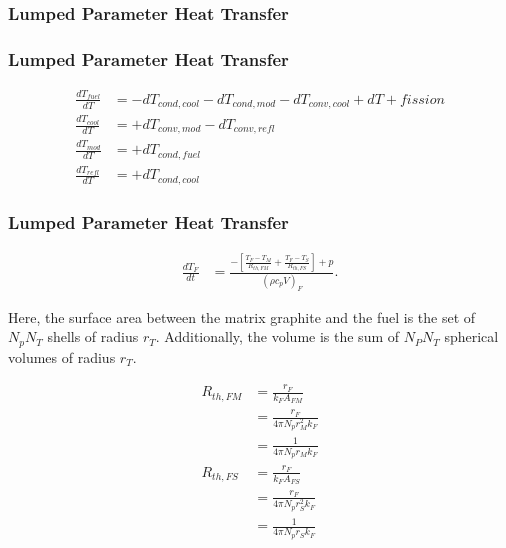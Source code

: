 \begin{frame}[fragile]
  \frametitle{Lumped Parameter Heat Transfer}

\end{frame}

\begin{frame}[fragile]
  \frametitle{Lumped Parameter Heat Transfer}
\footnotesize{
  \begin{align} 
    \frac{dT_{fuel}}{dT} &=  - dT_{cond,cool} - dT_{cond,mod} - dT_{conv,cool} + dT+{fission}\\
    \frac{dT_{cool}}{dT} &=  + dT_{conv,mod} - dT_{conv,refl} \\
    \frac{dT_{mod}}{dT}  &=  + dT_{cond,fuel}\\
    \frac{dT_{refl}}{dT} &=  + dT_{cond,cool}
  \end{align}
}
\end{frame}


\begin{frame}[fragile]
\frametitle{Lumped Parameter Heat Transfer}
\footnotesize{
\begin{align}
\frac{dT_{F}}{dt} &= \frac{-\left[\frac{T_{F} - T_{M}}{R_{th,FM}} +
\frac{T_{F}-T_{S}}{R_{th,FS}}\right] + p}{\left(\rho c_pV\right)_{F}}.
\label{dTfdt}
\end{align}

Here, the surface area between the matrix graphite and the fuel is the set of 
$N_pN_T$ shells of radius $r_T$.  Additionally, the volume is the sum of 
$N_PN_T$ spherical volumes of radius $r_T$.

\begin{align}
R_{th,FM} &= \frac{r_F}{k_FA_{FM}}\\
          &= \frac{r_F}{4\pi N_pr_M^2k_F}\\
          &= \frac{1}{4\pi N_pr_Mk_F}\\
R_{th,FS} &= \frac{r_F}{k_FA_{FS}}\\
          &= \frac{r_F}{4\pi N_pr_S^2k_F}\\
          &= \frac{1}{4\pi N_pr_Sk_F}
\end{align}
}
\end{frame}


